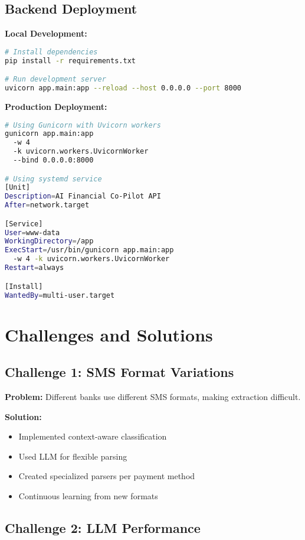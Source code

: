 \documentclass[11pt,a4paper]{report}
\begin{document}
\subsection{Backend Deployment}

\textbf{Local Development:}
\begin{lstlisting}[language=bash]
# Install dependencies
pip install -r requirements.txt

# Run development server
uvicorn app.main:app --reload --host 0.0.0.0 --port 8000
\end{lstlisting}

\textbf{Production Deployment:}
\begin{lstlisting}[language=bash]
# Using Gunicorn with Uvicorn workers
gunicorn app.main:app 
  -w 4 
  -k uvicorn.workers.UvicornWorker 
  --bind 0.0.0.0:8000

# Using systemd service
[Unit]
Description=AI Financial Co-Pilot API
After=network.target

[Service]
User=www-data
WorkingDirectory=/app
ExecStart=/usr/bin/gunicorn app.main:app 
  -w 4 -k uvicorn.workers.UvicornWorker
Restart=always

[Install]
WantedBy=multi-user.target
\end{lstlisting}

\section{Challenges and Solutions}

\subsection{Challenge 1: SMS Format Variations}

\textbf{Problem:} Different banks use different SMS formats, making extraction difficult.

\textbf{Solution:}
\begin{itemize}
    \item Implemented context-aware classification
    \item Used LLM for flexible parsing
    \item Created specialized parsers per payment method
    \item Continuous learning from new formats
\end{itemize}

\subsection{Challenge 2: LLM Performance}
\end{document}
